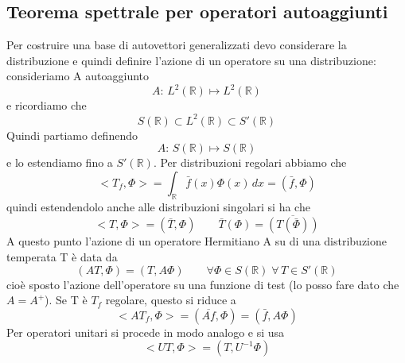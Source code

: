 \documentclass[a4paper,11pt]{report}
\theoremstyle{remark}
\theoremstyle{definition}
\newcommand{\R}{\mathbb{R}}
\begin{document}
\subsection*{Teorema spettrale per operatori autoaggiunti}
Per costruire una base di autovettori generalizzati devo considerare la distribuzione e quindi definire l'azione di un operatore su una distribuzione: consideriamo A autoaggiunto 
\begin{equation*}
	A: \, L^2(\R) \mapsto L^2(\R)
\end{equation*}
e ricordiamo che 
\begin{equation*}
	S(\R) \subset L^2(\R) \subset S'(\R)
\end{equation*}
Quindi partiamo definendo 
\begin{equation*}
	A: \, S(\R) \mapsto S(\R)
\end{equation*}
e lo estendiamo fino a $S'(\R)$. Per distribuzioni regolari abbiamo che 
\begin{equation*}
	<T_f,\varPhi> = \int_\R \bar{f}(x)\varPhi(x) \, dx = (\bar{f}, \varPhi)
\end{equation*}
quindi estendendolo anche alle distribuzioni singolari si ha che 
\begin{equation*}
	<T,\varPhi> = (\bar{T}, \varPhi) \qquad \bar{T}(\varPhi) = \overline{(T(\bar{\varPhi}))}
\end{equation*}
A questo punto l'azione di un operatore Hermitiano A su di una distribuzione temperata T è data da 
\begin{equation*}
	(AT,\varPhi) = (T,A\varPhi) \qquad \forall \varPhi \in S(\R) \; \forall \, T \in S'(\R)
\end{equation*}
cioè sposto l'azione dell'operatore su una funzione di test (lo posso fare dato che $A=A^+$). Se T è $T_f$ regolare, questo si riduce a 
\begin{equation*}
	<AT_f, \varPhi> = (\overline{Af}, \varPhi) = (\bar{f}, A\varPhi)
\end{equation*}
Per operatori unitari si procede in modo analogo e si usa 
\begin{equation*}
	<UT, \varPhi> = (T, U^{-1}\varPhi)
\end{equation*}
\end{document}
